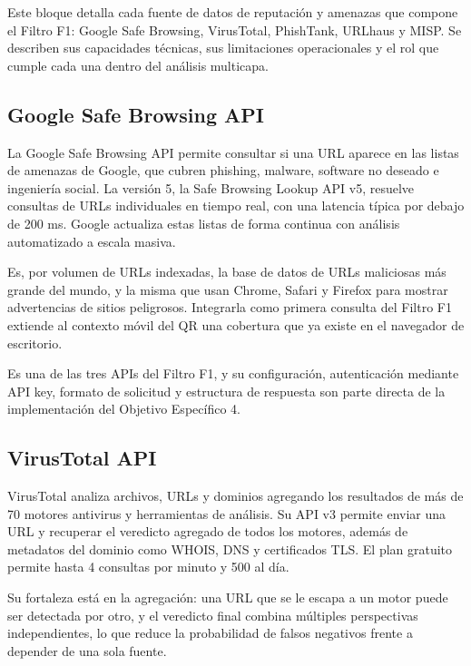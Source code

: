 Este bloque detalla cada fuente de datos de reputaci\'on y amenazas que compone el Filtro F1: Google Safe Browsing, VirusTotal, PhishTank, URLhaus y MISP. Se describen sus capacidades t\'ecnicas, sus limitaciones operacionales y el rol que cumple cada una dentro del an\'alisis multicapa.

\subsection{Google Safe Browsing API}

La Google Safe Browsing API \cite{google_safebrowsing} permite consultar si una URL aparece en las listas de amenazas de Google, que cubren phishing, malware, software no deseado e ingenier\'ia social. La versi\'on 5, la Safe Browsing Lookup API v5, resuelve consultas de URLs individuales en tiempo real, con una latencia t\'ipica por debajo de 200 ms. Google actualiza estas listas de forma continua con an\'alisis automatizado a escala masiva.

Es, por volumen de URLs indexadas, la base de datos de URLs maliciosas m\'as grande del mundo, y la misma que usan Chrome, Safari y Firefox para mostrar advertencias de sitios peligrosos. Integrarla como primera consulta del Filtro F1 extiende al contexto m\'ovil del QR una cobertura que ya existe en el navegador de escritorio.

Es una de las tres APIs del Filtro F1, y su configuraci\'on, autenticaci\'on mediante API key, formato de solicitud y estructura de respuesta son parte directa de la implementaci\'on del Objetivo Espec\'ifico 4.

\subsection{VirusTotal API}

VirusTotal \cite{virustotal_apiv3} analiza archivos, URLs y dominios agregando los resultados de m\'as de 70 motores antivirus y herramientas de an\'alisis. Su API v3 permite enviar una URL y recuperar el veredicto agregado de todos los motores, adem\'as de metadatos del dominio como WHOIS, DNS y certificados TLS. El plan gratuito permite hasta 4 consultas por minuto y 500 al d\'ia.

Su fortaleza est\'a en la agregaci\'on: una URL que se le escapa a un motor puede ser detectada por otro, y el veredicto final combina m\'ultiples perspectivas independientes, lo que reduce la probabilidad de falsos negativos frente a depender de una sola fuente.


